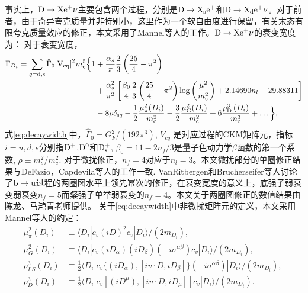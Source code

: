 事实上，$\mathrm{D\to X e^{+}\nu}$主要包含两个过程，分别是$\mathrm{D\to X_s e^{+}}$和$\mathrm{D\to X_d e^{+}\nu}$。对于前者，由于奇异夸克质量并非特别小，这里作为一个软自由度进行保留，有关末态有限夸克质量效应的修正，本文采用了Mannel等人的工作。$\mathrm{D\to X e^{+}\nu}$的衰变宽度为：
对于衰变宽度，
\begin{equation}
\begin{aligned}
    \Gamma_{D_{i}} = \sum_{q = \mathrm{d}, \mathrm{s}} \hat{\Gamma}_0 \mathrm{\left| V_{\mathrm{c}q} \right|^2} m_{\mathrm{c}}^5 \Big\{ 1 & + \frac{\alpha_s}{\pi} \frac{2}{3} \left( \frac{25}{4} - \pi^2 \right)\\
    & + \frac{\alpha_s^2}{\pi^2} \left[ \frac{\beta_0}{4} \frac{2}{3} \left( \frac{25}{4} - \pi^2 \right) \log \left( \frac{\mu^2}{m_{\mathrm{c}}^2} \right) + 2.14690 n_l - 29.88311 \right]\\  
    &- 8 \rho \delta_{\mathrm{s}q} - \frac{1}{2} \frac{\mu_{\pi}^{2}(D_{i})}{m_{\mathrm{c}}^2} - \frac{3}{2} \frac{\mu_{\mathrm{G}}^{2}(D_{i})}{m_{\mathrm{c}}^2} + 6 \frac{\rho_{\mathrm{D}}^3\left(D_{i}\right)}{m_{\mathrm{c}}^3} + \dots \Big\},
\end{aligned}
\label{eq:decaywidth}
\end{equation}
式\eqref{eq:decaywidth}中，$\hat{\Gamma}_0 = {G_F^2 }/{(192 \pi^3)}$, $V_{cq}$ 是对应过程的CKM矩阵元，指标$i=u, d, s$分别指$\mathrm{D^{+}}$,$\mathrm{D^{0}}$和$\mathrm{D_s^+}$, $\beta_0 = 11-2n_f /3$是量子色动力学$\beta$函数的第一个系数, $\rho\equiv m_s^2/m_c^2$. 对于微扰修正，$n_{f}=4$对应于$n_{l}=3$。本文微扰部分的单圈修正结果与DeFazio，Capdevila等人的工作一致\cite{DeFazio:1999ptt,Capdevila:2021vkf}. VanRitbergen和Brucherseifer等人讨论了$\mathrm{b\to u}$过程的两圈图水平上领先幂次的修正，在衰变宽度的意义上，底强子弱衰变弱衰变$n_{f}=5$而粲强子单举弱衰变的$n_{f}=4$。本文关于两圈图修正的数值结果由陈龙、马滟青老师提供。
关于\ref{eq:decaywidth}中非微扰矩阵元的定义，本文采用Mannel等人的约定：
\begin{equation}
    \begin{aligned}
        \mu_\pi^2(D_i) &\equiv \langle D_i| \bar c_v(iD)^2 c_v| D_i \rangle /(2m_{D_i}) , \; \\
        \mu_G^2(D_i) &\equiv \langle D_i| \bar c_v (iD_\alpha)(iD_\beta)(-i\sigma^{\alpha\beta}) c_v| D_i \rangle  /(2m_{D_i}),  \\
        \rho_{LS}^3(D_i) &\equiv \frac{1}{2}\langle D_i| \bar c_v \{(iD_\alpha), [iv\cdot D, iD_\beta ]\} (-i\sigma^{\alpha\beta})| D_i \rangle /(2m_{D_i}) , \;\\ 
        \rho^3_{D}(D_i) &\equiv \frac{1}{2}\langle D_i| \bar c_v  [(iD^\mu), [iv\cdot D, iD_\mu]] c_v | D_i \rangle /(2m_{D_i}). \; \\
        \end{aligned}
\end{equation}
